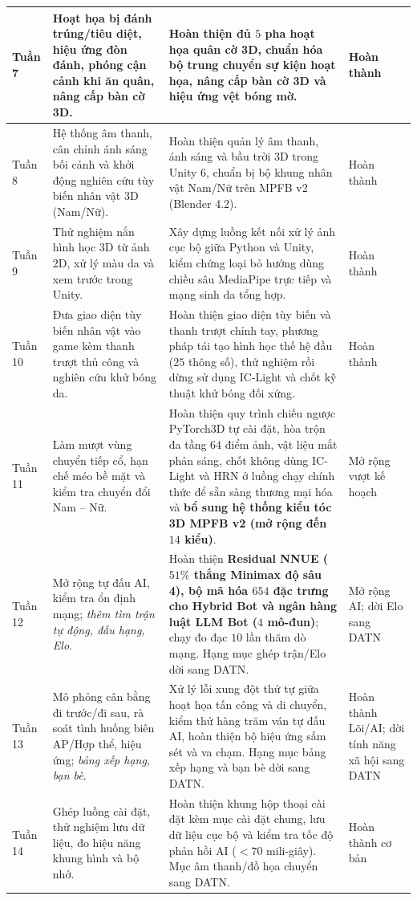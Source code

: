 \begin{longtable}{|C{1.3cm}|L{5.4cm}|L{5.5cm}|C{2.6cm}|}
    \hline
    Tuần 7 & Hoạt họa bị đánh trúng/tiêu diệt, hiệu ứng đòn đánh, phóng cận cảnh khi ăn quân, nâng cấp bàn cờ 3D. & Hoàn thiện đủ $5$ pha hoạt họa quân cờ 3D, chuẩn hóa bộ trung chuyển sự kiện hoạt họa, nâng cấp bàn cờ 3D và hiệu ứng vệt bóng mờ. & Hoàn thành \\
    \hline
    Tuần 8 & Hệ thống âm thanh, cân chỉnh ánh sáng bối cảnh và khởi động nghiên cứu tùy biến nhân vật 3D (Nam/Nữ). & Hoàn thiện quản lý âm thanh, ánh sáng và bầu trời 3D trong Unity 6, chuẩn bị bộ khung nhân vật Nam/Nữ trên MPFB v2 (Blender 4.2). & Hoàn thành \\
    \hline
    Tuần 9 & Thử nghiệm nắn hình học 3D từ ảnh 2D, xử lý màu da và xem trước trong Unity. & Xây dựng luồng kết nối xử lý ảnh cục bộ giữa Python và Unity, kiểm chứng loại bỏ hướng dùng chiều sâu MediaPipe trực tiếp và mạng sinh da tổng hợp. & Hoàn thành \\
    \hline
    Tuần 10 & Đưa giao diện tùy biến nhân vật vào game kèm thanh trượt thủ công và nghiên cứu khử bóng da. & Hoàn thiện giao diện tùy biến và thanh trượt chỉnh tay, phương pháp tái tạo hình học thế hệ đầu ($25$ thông số), thử nghiệm rồi dừng sử dụng IC-Light và chốt kỹ thuật khử bóng đối xứng. & Hoàn thành \\
    \hline
    Tuần 11 & Làm mượt vùng chuyển tiếp cổ, hạn chế méo bề mặt và kiểm tra chuyển đổi Nam -- Nữ. & Hoàn thiện quy trình chiếu ngược PyTorch3D tự cài đặt, hòa trộn đa tầng $64$ điểm ảnh, vật liệu mắt phản sáng, chốt không dùng IC-Light và HRN ở luồng chạy chính thức để sẵn sàng thương mại hóa và \textbf{bổ sung hệ thống kiểu tóc 3D MPFB v2 (mở rộng đến $14$ kiểu)}. & Mở rộng vượt kế hoạch \\
    \hline
    Tuần 12 & Mở rộng tự đấu AI, kiểm tra ổn định mạng; \textit{thêm tìm trận tự động, đấu hạng, Elo}. & Hoàn thiện \textbf{Residual NNUE ($51\%$ thắng Minimax độ sâu 4), bộ mã hóa $654$ đặc trưng cho Hybrid Bot và ngân hàng luật LLM Bot ($4$ mô-đun)}; chạy đo đạc $10$ lần thăm dò mạng. Hạng mục ghép trận/Elo dời sang DATN. & Mở rộng AI; dời Elo sang DATN \\
    \hline
    Tuần 13 & Mô phỏng cân bằng đi trước/đi sau, rà soát tình huống biên AP/Hợp thể, hiệu ứng; \textit{bảng xếp hạng, bạn bè}. & Xử lý lỗi xung đột thứ tự giữa hoạt họa tấn công và di chuyển, kiểm thử hàng trăm ván tự đấu AI, hoàn thiện bộ hiệu ứng sấm sét và va chạm. Hạng mục bảng xếp hạng và bạn bè dời sang DATN. & Hoàn thành Lõi/AI; dời tính năng xã hội sang DATN \\
    \hline
    Tuần 14 & Ghép luồng cài đặt, thử nghiệm lưu dữ liệu, đo hiệu năng khung hình và bộ nhớ. & Hoàn thiện khung hộp thoại cài đặt kèm mục cài đặt chung, lưu dữ liệu cục bộ và kiểm tra tốc độ phản hồi AI ($<70$ mili-giây). Mục âm thanh/đồ họa chuyển sang DATN. & Hoàn thành cơ bản \\

\end{longtable}
